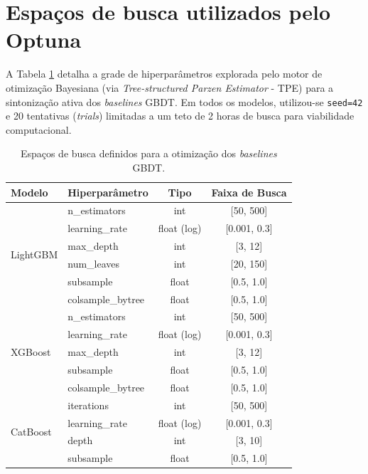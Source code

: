\documentclass[12pt,a4paper]{article}
\begin{document}
\clearpage
\section{Espaços de busca utilizados pelo Optuna}
A Tabela \ref{tab:optuna_spaces} detalha a grade de hiperparâmetros explorada pelo motor de otimização Bayesiana (via \textit{Tree-structured Parzen Estimator} - TPE) para a sintonização ativa dos \textit{baselines} GBDT. Em todos os modelos, utilizou-se \texttt{seed=42} e 20 tentativas (\textit{trials}) limitadas a um teto de 2 horas de busca para viabilidade computacional.

\begin{table}[htpb]
\centering
\small
\caption{Espaços de busca definidos para a otimização dos \textit{baselines} GBDT.}
\label{tab:optuna_spaces}
\vspace{0.2cm}
\begin{tabular}{@{}llcc@{}}
\toprule
\textbf{Modelo} & \textbf{Hiperparâmetro} & \textbf{Tipo} & \textbf{Faixa de Busca} \\ \midrule
\multirow{6}{*}{LightGBM} & n\_estimators & int & [50, 500] \\
 & learning\_rate & float (log) & [0.001, 0.3] \\
 & max\_depth & int & [3, 12] \\
 & num\_leaves & int & [20, 150] \\
 & subsample & float & [0.5, 1.0] \\
 & colsample\_bytree & float & [0.5, 1.0] \\ \midrule
\multirow{5}{*}{XGBoost} & n\_estimators & int & [50, 500] \\
 & learning\_rate & float (log) & [0.001, 0.3] \\
 & max\_depth & int & [3, 12] \\
 & subsample & float & [0.5, 1.0] \\
 & colsample\_bytree & float & [0.5, 1.0] \\ \midrule
\multirow{4}{*}{CatBoost} & iterations & int & [50, 500] \\
 & learning\_rate & float (log) & [0.001, 0.3] \\
 & depth & int & [3, 10] \\
 & subsample & float & [0.5, 1.0] \\ \bottomrule
\end{tabular}
\end{table}

\clearpage
\end{document}
